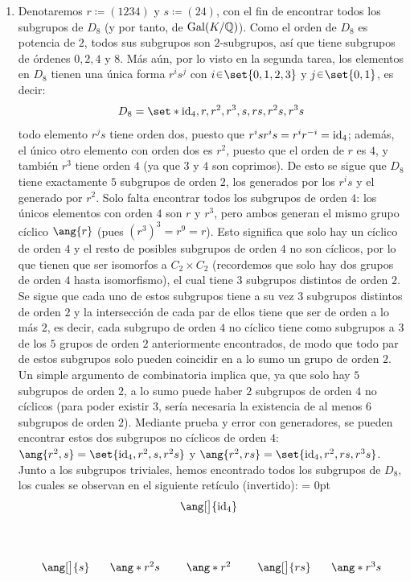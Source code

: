 \begin{sol}
\begin{enumerate}[label=\alph*)]
\item 
Denotaremos $r \coloneq (1234)$ y $s\coloneq (24)$, con el fin de encontrar todos los subgrupos de $D_8$ (y por tanto, de $\operatorname{Gal}(K/\mathbb{Q})$). Como el orden de $D_8$ es potencia de $2$, todos sus subgrupos son $2\text{-subgrupos}$, así que tiene subgrupos de órdenes $0,2,4$ y $8$. Más aún, por lo visto en la segunda tarea, los elementos en $D_8$ tienen una única forma $r^is^j$ con $i\en\set{0,1,2,3}$ y $j\en\set{0,1}$, es decir:
\[
D_8 = \set*{\id_4, r,r^2,r^3,s,rs,r^2s,r^3s}
\]
todo elemento $r^js$ tiene orden dos, puesto que $r^isr^is=r^ir^{-i}=\operatorname{id}_4$; además, el único otro elemento con orden dos es $r^2$, puesto que el orden de $r$ es $4$, y también $r^3$ tiene orden $4$ (ya que $3$ y $4$ son coprimos). De esto se sigue que $D_8$ tiene exactamente $5$ subgrupos de orden $2$, los generados por los $r^is$ y el generado por $r^2$. Solo falta encontrar todos los subgrupos de orden $4$: los únicos elementos con orden $4$ son $r$ y $r^3$, pero ambos generan el mismo grupo cíclico $\ang{r}$ (pues $(r^3)^3 = r^9 = r$). Esto significa que solo hay un cíclico de orden $4$ y el resto de posibles subgrupos de orden $4$ no son cíclicos, por lo que tienen que ser isomorfos a $C_2 \times C_2$ (recordemos que solo hay dos grupos de orden $4$ hasta isomorfismo), el cual tiene $3$ subgrupos distintos de orden $2$. Se sigue que cada uno de estos subgrupos tiene a su vez $3$ subgrupos distintos de orden $2$ y la intersección de cada par de ellos tiene que ser de orden a lo más $2$, es decir, cada subgrupo de orden $4$ no cíclico tiene como subgrupos a $3$ de los $5$ grupos de orden $2$ anteriormente encontrados, de modo que todo par de estos subgrupos solo pueden coincidir en a lo sumo un grupo de orden $2$. Un simple argumento de combinatoria implica que, ya que solo hay $5$ subgrupos de orden $2$, a lo sumo puede haber $2$ subgrupos de orden $4$ no cíclicos (para poder existir $3$, sería necesaria la existencia de al menos $6$ subgrupos de orden $2$). Mediante prueba y error con generadores, se pueden encontrar estos dos subgrupos no cíclicos de orden $4$: $\ang{r^2,s} = \set{\id_4,r^2,s,r^2s}$ y $\ang{r^2,rs} = \set{\id_4,r^2,rs,r^3s}$. Junto a los subgrupos triviales, hemos encontrado todos los subgrupos de $D_8$, los cuales se observan en el siguiente retículo (invertido):
{\mathsurround = 0pt
\[\begin{tikzcd}[cramped,column sep=1.2em]
	&& {\ang[\big]{\id_4}} \\
	\\
	{\ang[\big]{s}} & {\ang*{r^2s}} & {\ang*{r^2}} & {\ang[\big]{rs}} & {\ang*{r^3s}} \\

\end{tikzcd}\]}
\end{enumerate}
\end{sol}

